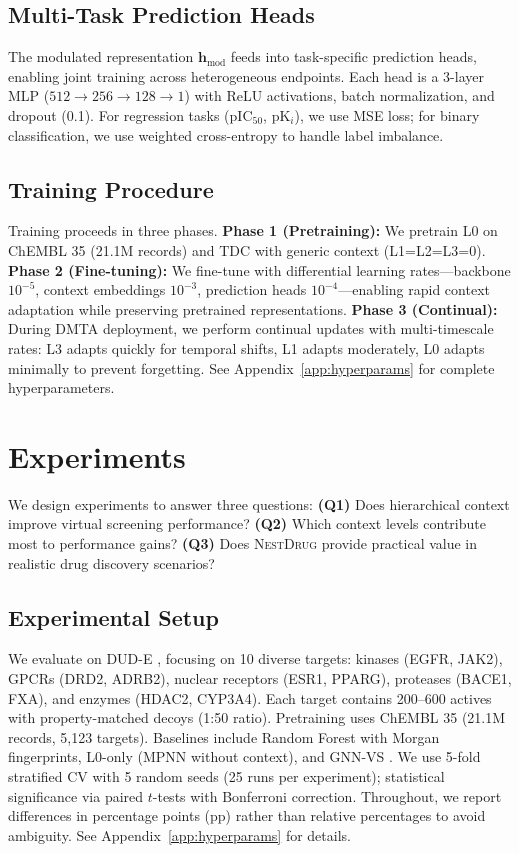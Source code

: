 \documentclass[sigconf,anonymous]{acmart}
\newcommand{\methodname}{\textsc{NestDrug}}
\newcommand{\hmod}{\mathbf{h}_{\text{mod}}}
\begin{document}
\subsection{Multi-Task Prediction Heads}

The modulated representation $\hmod$ feeds into task-specific prediction heads, enabling joint training across heterogeneous endpoints. Each head is a 3-layer MLP ($512 \rightarrow 256 \rightarrow 128 \rightarrow 1$) with ReLU activations, batch normalization, and dropout (0.1). For regression tasks (pIC$_{50}$, pK$_i$), we use MSE loss; for binary classification, we use weighted cross-entropy to handle label imbalance.

\subsection{Training Procedure}

Training proceeds in three phases. \textbf{Phase 1 (Pretraining):} We pretrain L0 on ChEMBL 35 \cite{zdrazil_2024_chembl} (21.1M records) and TDC \cite{huang_2021_tdc} with generic context (L1=L2=L3=0). \textbf{Phase 2 (Fine-tuning):} We fine-tune with differential learning rates---backbone $10^{-5}$, context embeddings $10^{-3}$, prediction heads $10^{-4}$---enabling rapid context adaptation while preserving pretrained representations. \textbf{Phase 3 (Continual):} During DMTA deployment, we perform continual updates with multi-timescale rates: L3 adapts quickly for temporal shifts, L1 adapts moderately, L0 adapts minimally to prevent forgetting. See Appendix~\ref{app:hyperparams} for complete hyperparameters.

\section{Experiments}
\label{sec:experiments}

We design experiments to answer three questions: \textbf{(Q1)} Does hierarchical context improve virtual screening performance? \textbf{(Q2)} Which context levels contribute most to performance gains? \textbf{(Q3)} Does \methodname{} provide practical value in realistic drug discovery scenarios?

\subsection{Experimental Setup}

We evaluate on DUD-E \cite{mysinger_2012_dude}, focusing on 10 diverse targets: kinases (EGFR, JAK2), GPCRs (DRD2, ADRB2), nuclear receptors (ESR1, PPARG), proteases (BACE1, FXA), and enzymes (HDAC2, CYP3A4). Each target contains 200--600 actives with property-matched decoys (1:50 ratio). Pretraining uses ChEMBL 35 \cite{zdrazil_2024_chembl} (21.1M records, 5,123 targets). Baselines include Random Forest with Morgan fingerprints, L0-only (MPNN without context), and GNN-VS \cite{lim_2019_gnn_vs}. We use 5-fold stratified CV with 5 random seeds (25 runs per experiment); statistical significance via paired $t$-tests with Bonferroni correction. Throughout, we report differences in percentage points (pp) rather than relative percentages to avoid ambiguity. See Appendix~\ref{app:hyperparams} for details.
\end{document}
